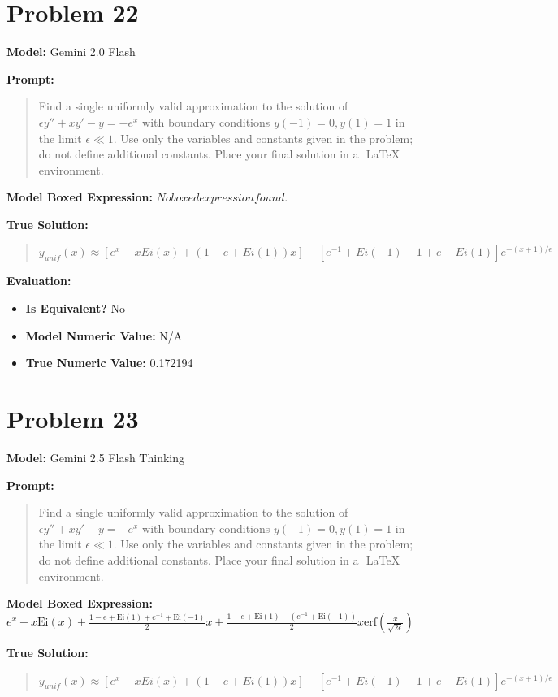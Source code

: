 \documentclass{article}
\begin{document}
\section*{Problem 22}
\textbf{Model:} Gemini 2.0 Flash

\textbf{Prompt:}
\begin{quote}
Find a single uniformly valid approximation to the solution of $\epsilon y'' + x y' - y = -e^x$ with boundary conditions $y(-1)=0, y(1)=1$ in the limit $\epsilon \ll 1$. Use only the variables and constants given in the problem; do not define additional constants. Place your final solution in a $\boxed{}$ LaTeX environment.
\end{quote}
\textbf{Model Boxed Expression:} $No boxed expression found.$

\textbf{True Solution:}
\begin{quote}
$y_{unif}(x) \approx \left[ e^x - x Ei(x) + (1 - e + Ei(1)) x \right] - \left[e^{-1} + Ei(-1) - 1 + e - Ei(1)\right] e^{-(x+1)/\epsilon}$
\end{quote}

\textbf{Evaluation:}
\begin{itemize}
\item \textbf{Is Equivalent?} No
\item \textbf{Model Numeric Value:} N/A
\item \textbf{True Numeric Value:} 0.172194
\end{itemize}
\vspace{1cm}
\section*{Problem 23}
\textbf{Model:} Gemini 2.5 Flash Thinking

\textbf{Prompt:}
\begin{quote}
Find a single uniformly valid approximation to the solution of $\epsilon y'' + x y' - y = -e^x$ with boundary conditions $y(-1)=0, y(1)=1$ in the limit $\epsilon \ll 1$. Use only the variables and constants given in the problem; do not define additional constants. Place your final solution in a $\boxed{}$ LaTeX environment.
\end{quote}
\textbf{Model Boxed Expression:} $e^x - x \text{Ei}(x) + \frac{1-e+\text{Ei}(1)+e^{-1}+\text{Ei}(-1)}{2} x + \frac{1-e+\text{Ei}(1)-(e^{-1}+\text{Ei}(-1))}{2} x \text{erf}\left(\frac{x}{\sqrt{2\epsilon}}\right)$

\textbf{True Solution:}
\begin{quote}
$y_{unif}(x) \approx \left[ e^x - x Ei(x) + (1 - e + Ei(1)) x \right] - \left[e^{-1} + Ei(-1) - 1 + e - Ei(1)\right] e^{-(x+1)/\epsilon}$
\end{quote}
\end{document}
